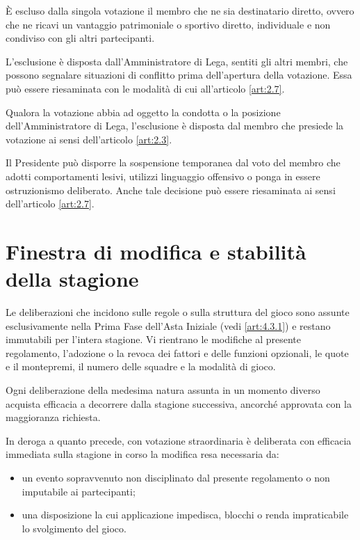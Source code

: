 È escluso dalla singola votazione il membro che ne sia destinatario diretto, ovvero che ne ricavi un vantaggio patrimoniale o sportivo diretto, individuale e non condiviso con gli altri partecipanti.

L'esclusione è disposta dall'Amministratore di Lega, sentiti gli altri membri, che possono segnalare situazioni di conflitto prima dell'apertura della votazione. Essa può essere riesaminata con le modalità di cui all'articolo \ref{art:2.7}.

Qualora la votazione abbia ad oggetto la condotta o la posizione dell'Amministratore di Lega, l'esclusione è disposta dal membro che presiede la votazione ai sensi dell'articolo \ref{art:2.3}.

Il Presidente può disporre la sospensione temporanea dal voto del membro che adotti comportamenti lesivi, utilizzi linguaggio offensivo o ponga in essere ostruzionismo deliberato. Anche tale decisione può essere riesaminata ai sensi dell'articolo \ref{art:2.7}.

\section{Finestra di modifica e stabilità della stagione}
\label{art:2.6}

Le deliberazioni che incidono sulle regole o sulla struttura del gioco sono assunte esclusivamente nella Prima Fase dell'Asta Iniziale (vedi \ref{art:4.3.1}) e restano immutabili per l'intera stagione. Vi rientrano le modifiche al presente regolamento, l'adozione o la revoca dei fattori e delle funzioni opzionali, le quote e il montepremi, il numero delle squadre e la modalità di gioco.

Ogni deliberazione della medesima natura assunta in un momento diverso acquista efficacia a decorrere dalla stagione successiva, ancorché approvata con la maggioranza richiesta.

In deroga a quanto precede, con votazione straordinaria è deliberata con efficacia immediata sulla stagione in corso la modifica resa necessaria da:

\begin{itemize}
\item un evento sopravvenuto non disciplinato dal presente regolamento o non imputabile ai partecipanti;
\item una disposizione la cui applicazione impedisca, blocchi o renda impraticabile lo svolgimento del gioco.
\end{itemize}


